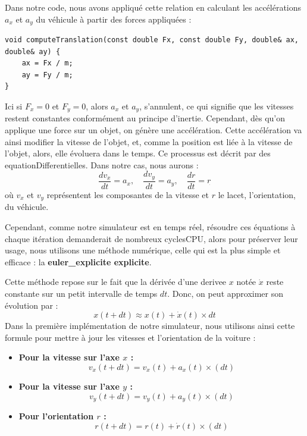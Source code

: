Dans notre code, nous avons appliqué cette relation en calculant les accélérations $a_x$ et $a_y$ du véhicule à partir des forces appliquées :


\begin{lstlisting}[style=CStyle,label={lst:void_computeTranslation}]
void computeTranslation(const double Fx, const double Fy, double& ax, double& ay) {
    ax = Fx / m;
    ay = Fy / m;
}
\end{lstlisting}

Ici si $F_x = 0$ et $F_y = 0$, alors $a_x$ et $a_y$, s'annulent, ce qui signifie que les vitesses restent constantes conformément au principe d'inertie.
Cependant, dès qu'on applique une force sur un objet, on génère une accélération.
Cette accélération va ainsi modifier la vitesse de l'objet, et, comme la position est liée à la vitesse de l'objet, alors, elle évoluera dans le temps.
Ce processus est décrit par des \glspl{equationDifferentielle}.
Dans notre cas, nous aurons :
$$\frac{d v_x}{dt} = a_x, \quad \frac{d v_y}{dt} = a_y, \quad \frac{d r}{dt} = r_{\dot{}}$$
où $v_x$ et $v_y$ représentent les composantes de la vitesse et $r$ le lacet, l'orientation, du véhicule.

Cependant, comme notre simulateur est en temps réel, résoudre ces équations à chaque itération demanderait de nombreux \gls{cyclesCPU}, alors pour préserver leur usage, nous utilisons une méthode numérique, celle qui est la plus simple et efficace : la \textbf{\gls{euler_explicite} explicite}.

Cette méthode repose sur le fait que la dérivée d'une \gls{derivee} $x$ notée $\dot{x}$ reste constante sur un petit intervalle de temps $dt$.
Donc, on peut approximer son évolution par :
$$x(t+dt) \approx x(t) + \dot{x}(t) \times dt$$
Dans la première implémentation de notre simulateur, nous utilisons ainsi cette formule pour mettre à jour les vitesses et l'orientation de la voiture :
\\



\begin{itemize}
    \item \textbf{Pour la vitesse sur l'axe $x$ :}
    $$v_x(t+dt) = v_x(t)+a_x(t)\times(dt)$$
    \item \textbf{Pour la vitesse sur l'axe $y$ :}
    $$v_y(t+dt) = v_y(t)+a_y(t)\times(dt)$$
    \item \textbf{Pour l'orientation $r$ :}
    $$r(t+dt) = r(t)+\dot{r}(t)\times(dt)$$
\end{itemize}


